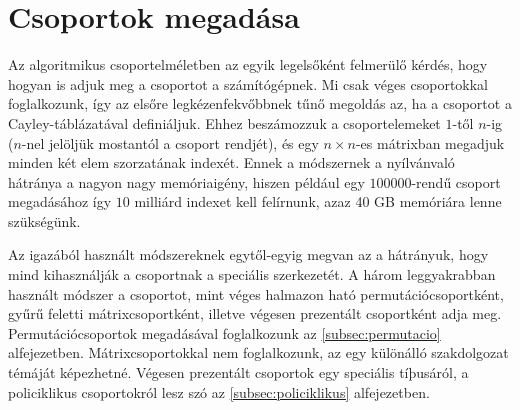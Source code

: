 \section{Csoportok megadása}
\label{sec:csoport}
Az algoritmikus csoportelméletben az egyik legelsőként felmerülő kérdés, hogy hogyan is adjuk meg a csoportot a számítógépnek.
Mi csak véges csoportokkal foglalkozunk, így az elsőre legkézenfekvőbbnek tűnő megoldás az, ha a csoportot a Cayley-táblázatával definiáljuk.
Ehhez beszámozzuk a csoportelemeket $1$-től $n$-ig ($n$-nel jelöljük mostantól a csoport rendjét),
és egy $n\times n$-es mátrixban megadjuk minden két elem szorzatának indexét.
Ennek a módszernek a nyílvánvaló hátránya a nagyon nagy memóriaigény,
hiszen például egy $100000$-rendű csoport megadásához így $10$ milliárd indexet kell felírnunk, azaz 40 GB memóriára lenne szükségünk.

Az igazából használt módszereknek egytől-egyig megvan az a hátrányuk, hogy mind kihasználják a csoportnak a speciális szerkezetét.
A három leggyakrabban használt módszer a csoportot, mint véges halmazon ható permutációcsoportként, gyűrű feletti mátrixcsoportként, illetve végesen prezentált csoportként adja meg.
Permutációcsoportok megadásával foglalkozunk az \ref{subsec:permutacio} alfejezetben.
Mátrixcsoportokkal nem foglalkozunk, az egy különálló szakdolgozat témáját képezhetné. 
Végesen prezentált csoportok egy speciális tíþusáról, a policiklikus csoportokról lesz szó az \ref{subsec:policiklikus} alfejezetben.




\clearpage
